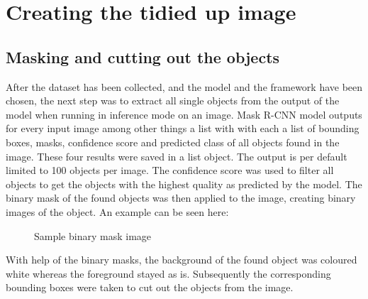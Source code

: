 \section{Creating the tidied up image}

\subsection{Masking and cutting out the objects}

After the dataset has been collected, and the model and the framework have been chosen, the next step was to extract all single objects from the output of the model when running in inference mode on an image. Mask R-CNN model outputs for every input image among other things a list with with each a list of bounding boxes, masks, confidence score and predicted class of all objects found in the image. These four results were saved in a list object. The output is per default limited to 100 objects per image. The confidence score was used to filter all objects to get the objects with the highest quality as predicted by the model. The binary mask of the found objects was then applied to the image, creating binary images of the object. An example can be seen here:

\begin{figure}[H]
	\caption{\label{fig:binary-mask} Sample binary mask image}
\end{figure}

With help of the binary masks, the background of the found object was coloured white whereas the foreground stayed as is. Subsequently the corresponding bounding boxes were taken to cut out the objects from the image.

